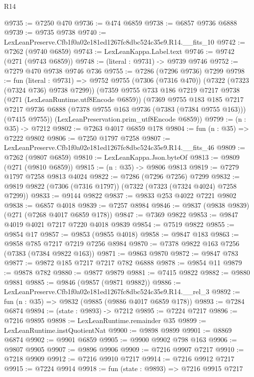\begin{lexlean}{R14}
\begin{coremodule}
@9735 := @7250 @470
@9736 := @474 @6859
@9738 := @6857 @9736 @6888
@9739 := @9735 @9738
@9740 := LexLeanPreserve.Cfb1f0a02e181ed1267fc8dbc524c35e9.R14.__fits_10
@9742 := @7262 (@9740 @6859)
@9743 := LexLeanKappa.Label.text
@9746 := @9742 (@271 (@9743 @6859))
@9748 := (literal : @9731) -> @9739 @9746
@9752 := @7279 @470 @9738 @9746 @736
@9755 := @7286 (@7296 @9736) @7299
@9798 := fun (literal : @9731) =>
  @9752
    @9755
    (@7306 (@7316 @470))
    (@7322 (@7323 (@7324 @736) @9738 @7299))
    (@7359
      @9755
      @733
      @186
      @7219
      @7217
      @9738
      (@271 (LexLeanRuntime.utf8Encode @6859))
      (@7369
        @9755
        @183
        @185
        @7217
        @7217
        @9736
        @6888
        (@7378 @9755 @163 @9736 (@7383 (@7384 @9755 @163)))
        (@7415 @9755))
      (LexLeanPreservation.prim_utf8Encode @6859))
@9799 := (n : @35) -> @7212
@9802 := @7263 @4017 @6859 @178
@9804 := fun (n : @35) => @7222 @9802
@9806 := @7250 @1797 @7258
@9807 := LexLeanPreserve.Cfb1f0a02e181ed1267fc8dbc524c35e9.R14.__fits_46
@9809 := @7262 (@9807 @6859)
@9810 := LexLeanKappa.Json.byteOf
@9813 := @9809 (@271 (@9810 @6859))
@9815 := (n : @35) -> @9806 @9813
@9819 := @7279 @1797 @7258 @9813 @4024
@9822 := @7286 (@7296 @7256) @7299
@9832 := @9819 @9822 (@7306 (@7316 @1797)) (@7322 (@7323 (@7324 @4024) @7258 @7299))
@9833 := @9144 @9822
@9837 := @9833 @253 @4022 @7221 @9802
@9838 := @6857 @4018
@9839 := @7257 @8984
@9846 := @9837 (@9838 @9839) (@271 (@7268 @4017 @6859 @178))
@9847 := @7369 @9822
@9853 := @9847 @4019 @4021 @7217 @7220 @4018 @9839
@9854 := @7519 @9822
@9855 := @9854 @17
@9857 := @9853 (@9855 @4018)
@9858 := @9847 @183
@9863 := @9858 @785 @7217 @7219 @7256 @8984
@9870 := @7378 @9822 @163 @7256 (@7383 (@7384 @9822 @163))
@9871 := @9863 @9870
@9872 := @9847 @783
@9877 := @9872 @185 @7217 @7217 @782 @6888
@9878 := @9854 @11
@9879 := @9878 @782
@9880 := @9877 @9879
@9881 := @7415 @9822
@9882 := @9880 @9881
@9885 := @9846 (@9857 (@9871 @9882))
@9886 := LexLeanPreserve.Cfb1f0a02e181ed1267fc8dbc524c35e9.R14.__rel_3
@9892 := fun (n : @35) => @9832 (@9885 (@9886 @4017 @6859 @178))
@9893 := @7284 @6874
@9894 := (state : @9893) -> @7212
@9895 := @7224 @7217
@9896 := @7216 @9895
@9898 := LexLeanRuntime.remainder @35
@9899 := LexLeanRuntime.instQuotientNat
@9900 := @9898 @9899
@9901 := @8869 @6874
@9902 := @9901 @6859
@9905 := @9900 @9902 @798 @163
@9906 := @9807 @9905
@9907 := @9896 @9906
@9909 := @7216 @9907 @7217
@9910 := @7218 @9909
@9912 := @7216 @9910 @7217
@9914 := @7216 @9912 @7217
@9915 := @7224 @9914
@9918 := fun (state : @9893) => @7216 @9915 @7217

\end{coremodule}
\end{lexlean}
